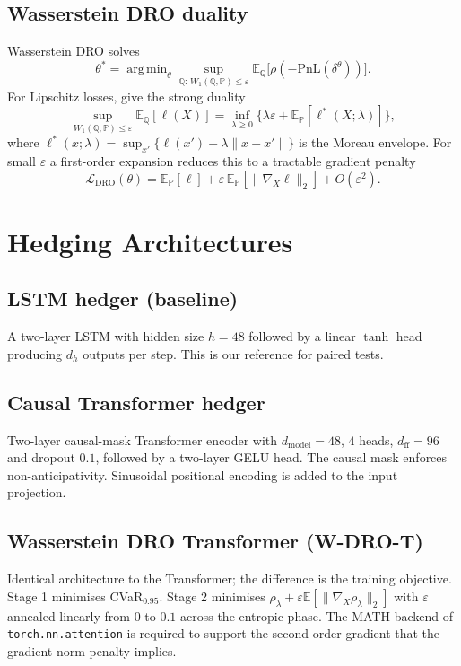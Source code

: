 \documentclass[11pt,a4paper]{article}
\newcommand{\E}{\mathbb{E}}
\newcommand{\PP}{\mathbb{P}}
\newcommand{\QQ}{\mathbb{Q}}
\DeclareMathOperator*{\argmin}{arg\,min}
\begin{document}
\subsection{Wasserstein DRO duality}

Wasserstein DRO solves
\begin{equation}
\theta^* = \argmin_\theta \sup_{\QQ:\,W_1(\QQ,\PP)\le \varepsilon}
\E_\QQ\big[\rho(-\mathrm{PnL}(\delta^\theta))\big].
\end{equation}
For Lipschitz losses, \citet{blanchet2019quantifying} give the strong
duality
\begin{equation}
\sup_{W_1(\QQ,\PP)\le\varepsilon} \E_\QQ[\ell(X)] =
\inf_{\lambda\ge 0}\big\{\lambda\varepsilon + \E_\PP[\ell^*(X;\lambda)]\big\},
\end{equation}
where $\ell^*(x;\lambda) = \sup_{x'}\{\ell(x') - \lambda\|x-x'\|\}$ is the
Moreau envelope.  For small $\varepsilon$ a first-order expansion
\citep{esfahani2018data} reduces this to a tractable gradient penalty
\begin{equation}
\mathcal{L}_{\mathrm{DRO}}(\theta) = \E_\PP[\ell] + \varepsilon\,\E_\PP[\|\nabla_X \ell\|_2] + O(\varepsilon^2).
\label{eq:wdro_dual}
\end{equation}

\section{Hedging Architectures}\label{sec:archs}

\subsection{LSTM hedger (baseline)}
A two-layer LSTM with hidden size $h=48$ followed by a linear $\tanh$ head
producing $d_h$ outputs per step.  This is our reference for paired tests.

\subsection{Causal Transformer hedger}
Two-layer causal-mask Transformer encoder with $d_{\text{model}}=48$, $4$
heads, $d_{\text{ff}}=96$ and dropout $0.1$, followed by a two-layer GELU
head.  The causal mask enforces non-anticipativity.  Sinusoidal positional
encoding is added to the input projection.

\subsection{Wasserstein DRO Transformer (W-DRO-T)}
Identical architecture to the Transformer; the difference is the training
objective.  Stage 1 minimises CVaR$_{0.95}$.  Stage 2 minimises
$\rho_\lambda + \varepsilon\E[\|\nabla_X \rho_\lambda\|_2]$ with
$\varepsilon$ annealed linearly from $0$ to $0.1$ across the entropic
phase.  The MATH backend of \texttt{torch.nn.attention} is required to
support the second-order gradient that the gradient-norm penalty implies.
\end{document}
